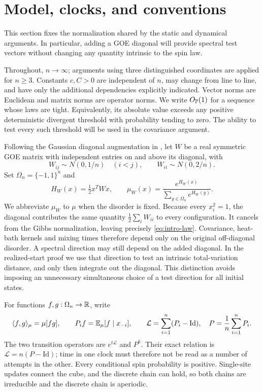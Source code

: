 \section{Model, clocks, and conventions}\label{sec:model}
This section fixes the normalization shared by the static and dynamical
arguments. In particular, adding a GOE diagonal will provide spectral
test vectors without changing any quantity intrinsic to the spin law.

Throughout, $n\to\infty$; arguments using three distinguished coordinates
are applied for $n\ge3$. Constants $c,C>0$ are independent of $n$, may
change from line to line, and have only the additional dependencies
explicitly indicated. Vector norms are Euclidean and matrix norms are
operator norms. We write $O_{\mathbb P}(1)$ for a sequence whose laws are
tight. Equivalently, its absolute value exceeds any positive deterministic
divergent threshold with probability tending to zero. The ability to
test every such threshold will be used in the covariance argument.

Following the Gaussian diagonal augmentation in
\cite[Equation~(1.1)]{comets1996}, let $W$ be a real symmetric GOE matrix
with independent entries on and above its diagonal, with
\[
 W_{ij}\sim N(0,1/n)\quad(i<j),\qquad
 W_{ii}\sim N(0,2/n).
\]
Set $\Omega_n=\{-1,1\}^n$ and
\[
 H_W(x)=\tfrac12x^TWx,
 \qquad
 \mu_W(x)=\frac{e^{H_W(x)}}{\sum_{y\in\Omega_n}e^{H_W(y)}}.
\]
We abbreviate $\mu_W$ to $\mu$ when the disorder is fixed. Because every $x_i^2=1$, the diagonal contributes the same quantity
$\frac12\sum_iW_{ii}$ to every configuration. It cancels from the Gibbs
normalization, leaving precisely \eqref{eq:intro-law}. Covariance,
heat-bath kernels and mixing times therefore depend only on the original
off-diagonal disorder. A spectral direction may still depend on the added
diagonal. In the realized-start proof we use that direction to test an
intrinsic total-variation distance, and only then integrate out the
diagonal. This distinction avoids imposing an unnecessary simultaneous
choice of a test direction for all initial states.

For functions $f,g:\Omega_n\to\mathbb R$, write
\[
 \langle f,g\rangle_\mu=\mu[fg],
 \qquad
 P_i f=\mathbb E_\mu[f\mid x_{-i}],
 \qquad
 \mathcal L=\sum_{i=1}^n(P_i-\mathrm{Id}),
 \quad P=\frac1n\sum_{i=1}^nP_i.
\]
The two transition operators are $e^{t\mathcal L}$ and $P^k$.
Their exact relation is $\mathcal L=n(P-\mathrm{Id})$; time in one clock
must therefore not be read as a number of attempts in the other.
Every conditional spin probability is positive. Single-site updates
connect the cube, and the discrete chain can hold, so both chains are
irreducible and the discrete chain is aperiodic.


